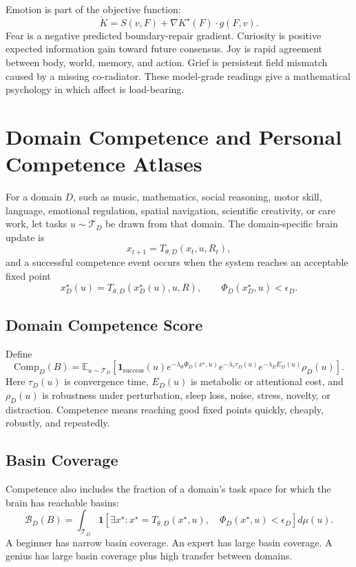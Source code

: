\documentclass[11pt]{article}
\theoremstyle{remark}
\theoremstyle{plain}
\newcommand{\E}{\mathbb E}
\begin{document}
Emotion is part of the objective function:
\[
\dot K
=
S(v,F)+\nabla K^\star(F)\cdot g(F,v).
\]
Fear is a negative predicted boundary-repair gradient. Curiosity is positive expected information gain toward future consensus. Joy is rapid agreement between body, world, memory, and action. Grief is persistent field mismatch caused by a missing co-radiator. These model-grade readings give a mathematical psychology in which affect is load-bearing.

\section{Domain Competence and Personal Competence Atlases}

For a domain \(D\), such as music, mathematics, social reasoning, motor skill, language, emotional regulation, spatial navigation, scientific creativity, or care work, let tasks \(u\sim\mathcal T_D\) be drawn from that domain. The domain-specific brain update is
\[
x_{t+1}=T_{\theta,D}(x_t,u,R_t),
\]
and a successful competence event occurs when the system reaches an acceptable fixed point
\[
x^\star_D(u)=T_{\theta,D}(x^\star_D(u),u,R),
\qquad
\Phi_D(x^\star_D,u)<\epsilon_D.
\]

\subsection{Domain Competence Score}

Define
\[
\boxed{
\mathrm{Comp}_D(B)
=
\E_{u\sim\mathcal T_D}
\left[
\mathbf 1_{\mathrm{success}}(u)
e^{-\lambda_\Phi \Phi_D(x^\star,u)}
e^{-\lambda_\tau \tau_D(u)}
e^{-\lambda_E E_D(u)}
\rho_D(u)
\right].
}
\]
Here \(\tau_D(u)\) is convergence time, \(E_D(u)\) is metabolic or attentional cost, and \(\rho_D(u)\) is robustness under perturbation, sleep loss, noise, stress, novelty, or distraction. Competence means reaching good fixed points quickly, cheaply, robustly, and repeatedly.

\subsection{Basin Coverage}

Competence also includes the fraction of a domain's task space for which the brain has reachable basins:
\[
\boxed{
\mathcal B_D(B)
=
\int_{\mathcal T_D}
\mathbf 1
\left[
\exists x^\star:
x^\star=T_{\theta,D}(x^\star,u),\quad
\Phi_D(x^\star,u)<\epsilon_D
\right]
d\mu(u).
}
\]
A beginner has narrow basin coverage. An expert has large basin coverage. A genius has large basin coverage plus high transfer between domains.
\end{document}
